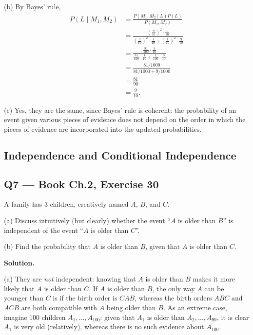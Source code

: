 \documentclass[11pt]{article}
\begin{document}
(b) By Bayes' rule,
\begin{align*}
P(L\mid M_1,M_2) &= \frac{P(M_1,M_2\mid L)P(L)}{P(M_1,M_2)} \\
&= \frac{\left(\tfrac{9}{10}\right)^2 \cdot \tfrac{1}{10}}{\left(\tfrac{9}{10}\right)^2 \cdot \tfrac{1}{10} + \left(\tfrac{1}{10}\right)^2 \cdot \tfrac{9}{10}} \\
&= \frac{\tfrac{81}{100}\cdot \tfrac{1}{10}}{\tfrac{81}{100}\cdot\tfrac{1}{10} + \tfrac{1}{100}\cdot\tfrac{9}{10}} \\
&= \frac{81/1000}{81/1000 + 9/1000} \\
&= \frac{81}{90} \\
&= \frac{9}{10}.
\end{align*}

(c) Yes, they are the same, since Bayes' rule is coherent: the probability of an event given various pieces of evidence does not depend on the order in which the pieces of evidence are incorporated into the updated probabilities.

\subsection{Independence and Conditional Independence}

\subsection*{Q7 --- Book Ch.2, Exercise 30}
\begin{qbox}
A family has 3 children, creatively named $A$, $B$, and $C$.

(a) Discuss intuitively (but clearly) whether the event ``$A$ is older than $B$'' is independent of the event ``$A$ is older than $C$''.

(b) Find the probability that $A$ is older than $B$, given that $A$ is older than $C$.
\end{qbox}
\textbf{Solution.}

(a) They are \emph{not} independent: knowing that $A$ is older than $B$ makes it more likely that $A$ is older than $C$. If $A$ is older than $B$, the only way $A$ can be younger than $C$ is if the birth order is $CAB$, whereas the birth orders $ABC$ and $ACB$ are both compatible with $A$ being older than $B$. As an extreme case, imagine 100 children $A_1,\dots,A_{100}$: given that $A_1$ is older than $A_2,\dots,A_{99}$, it is clear $A_1$ is very old (relatively), whereas there is no such evidence about $A_{100}$.
\end{document}
